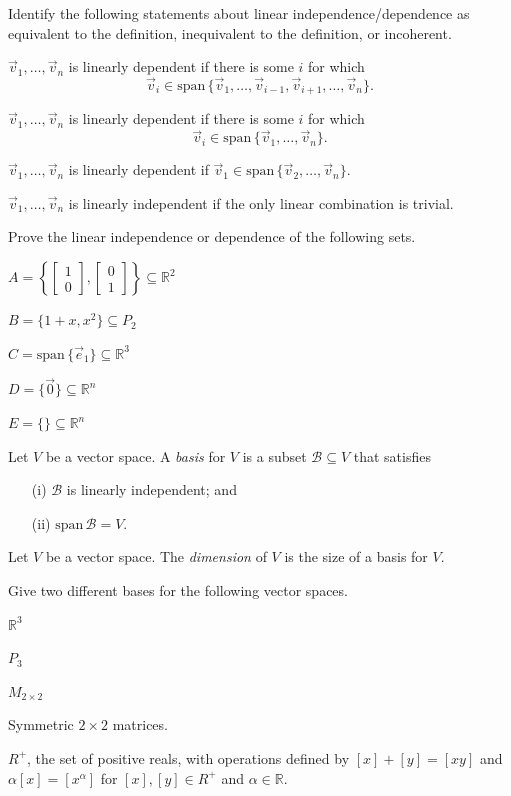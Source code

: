 \documentclass[14pt]{problemset}
\newcommand{\R}{\mathbb{R}}
\newcommand{\Span}{\mathrm{span}\,}
\newcommand{\mat}[1]{\begin{bmatrix}#1\end{bmatrix}}
\begin{document}
	\question
		Identify the following statements about linear independence/dependence
		as equivalent to the definition, inequivalent to the definition, or incoherent.
	\begin{parts}
		\item $\vec v_1,\ldots,\vec v_n$ is linearly dependent if there is some $i$ for which
			\[
				\vec v_i \in \Span\{\vec v_1,\ldots,\vec v_{i-1},\vec v_{i+1},\ldots,\vec v_n\}.
			\]
		\item $\vec v_1,\ldots,\vec v_n$ is linearly dependent if there is some $i$ for which
			\[
				\vec v_i \in \Span\{\vec v_1,\ldots,\vec v_n\}.
			\]
		\item $\vec v_1,\ldots,\vec v_n$ is linearly dependent if $\vec v_1\in\Span\{\vec v_2,\ldots, \vec v_n\}$.
		\item $\vec v_1,\ldots,\vec v_n$ is linearly independent if the only linear combination is trivial.
	\end{parts}

	\question
	Prove the linear independence or dependence of the following sets.
	\begin{parts}
		\item $A=\left\{\mat{1\\0},\mat{0\\1}\right\}\subseteq \R^2$
		\item $B=\{1+x,x^2\}\subseteq P_2$
		\item $C=\Span\{\vec e_1\}\subseteq \R^3$
		\item $D=\{\vec 0\}\subseteq \R^n$
		\item $E=\{\}\subseteq \R^n$
	\end{parts}

	\newpage
	\begin{definition}[Basis]
		Let $V$ be a vector space. A \emph{basis} for $V$ is a subset $\mathcal B\subseteq V$ that
		satisfies
		\begin{enumerate}
			\item[(i)] $\mathcal B$ is linearly independent; and
			\item[(ii)] $\Span\mathcal B = V$.
		\end{enumerate}
	\end{definition}
	\begin{definition}[Dimension]
		Let $V$ be a vector space. The \emph{dimension} of $V$ is the size of a basis for $V$.
	\end{definition}

	\question
	Give two different bases for the following vector spaces.
	\begin{parts}
		\item $\R^3$
		\item $P_3$
		\item $M_{2\times 2}$
		\item Symmetric $2\times 2$ matrices.
		\item $R^+$, the set of positive reals, with operations defined
			by $[x]+[y]=[xy]$ and $\alpha[x]=[x^\alpha]$ for $[x],[y]\in R^+$ and $\alpha\in \R$.
	\end{parts}
\end{document}
